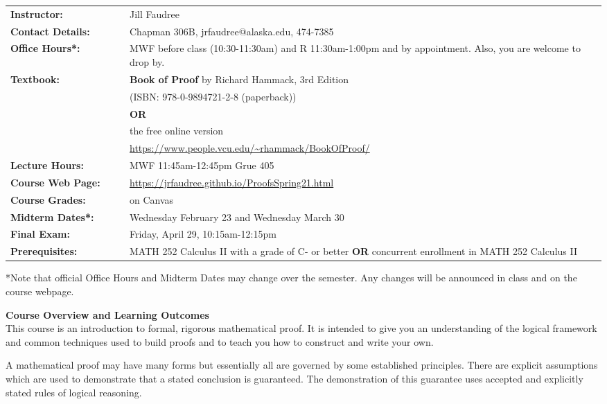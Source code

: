 \documentclass[12pt]{article}
\renewcommand{\emph}[1]{\textsf{\textbf{#1}}}
\newcommand{\localhead}[1]{\par\smallskip\textbf{#1}\nobreak\\}%
\def\heading#1{\localhead{\large\emph{#1}}}
\begin{document}
\begin{tabular}{p{0.2\linewidth}  p{0.8\linewidth}}
\textbf{Instructor:}& Jill Faudree\\
\textbf{Contact Details:}&Chapman 306B, jrfaudree@alaska.edu, 474-7385\\
\textbf{Office Hours*:}& MWF before class (10:30-11:30am) and R 11:30am-1:00pm and by appointment. Also, you are welcome to drop by.\\
\textbf{Textbook:} &\emph{Book of Proof} by Richard Hammack, 3rd Edition\\
 &(ISBN: 978-0-9894721-2-8 (paperback))\\
 & \textbf{OR}\\
 & the free online version \\
 &\url{https://www.people.vcu.edu/~rhammack/BookOfProof/}\\
\textbf{Lecture Hours:}& MWF 11:45am-12:45pm Grue 405\\
\textbf{Course Web Page:}& \url{https://jrfaudree.github.io/ProofsSpring21.html}\\
\textbf{Course Grades:}& on Canvas\\
\textbf{Midterm Dates*:}& Wednesday February 23 and Wednesday March 30\\
\textbf{Final Exam:}& Friday, April 29, 10:15am-12:15pm\\
\textbf{Prerequisites:} &MATH 252 Calculus II with a grade of C- or better \textbf{OR} concurrent enrollment in MATH 252 Calculus II\\
\end{tabular}

*Note that official Office Hours and Midterm Dates may change over the semester. Any changes will be announced in class and on the course webpage.\\

\heading{Course Overview and Learning Outcomes}

This course is an introduction to formal, rigorous mathematical proof. It is intended to give you an understanding of the logical framework and common techniques used to build proofs and to teach you how to construct and write your own. 

A mathematical proof may have many forms but essentially all are governed by some established principles. There are explicit assumptions which are used to demonstrate that a stated conclusion is guaranteed. The demonstration of this guarantee uses accepted and explicitly stated rules of logical reasoning. 
\end{document}
